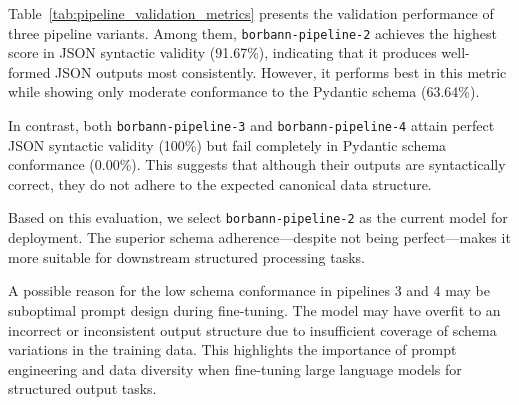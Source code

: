 Table~\ref{tab:pipeline_validation_metrics} presents the validation performance of three pipeline variants. Among them, \texttt{borbann-pipeline-2} achieves the highest score in JSON syntactic validity (91.67\%), indicating that it produces well-formed JSON outputs most consistently. However, it performs best in this metric while showing only moderate conformance to the Pydantic schema (63.64\%).

In contrast, both \texttt{borbann-pipeline-3} and \texttt{borbann-pipeline-4} attain perfect JSON syntactic validity (100\%) but fail completely in Pydantic schema conformance (0.00\%). This suggests that although their outputs are syntactically correct, they do not adhere to the expected canonical data structure.

Based on this evaluation, we select \texttt{borbann-pipeline-2} as the current model for deployment. The superior schema adherence—despite not being perfect—makes it more suitable for downstream structured processing tasks.

A possible reason for the low schema conformance in pipelines 3 and 4 may be suboptimal prompt design during fine-tuning. The model may have overfit to an incorrect or inconsistent output structure due to insufficient coverage of schema variations in the training data. This highlights the importance of prompt engineering and data diversity when fine-tuning large language models for structured output tasks.
